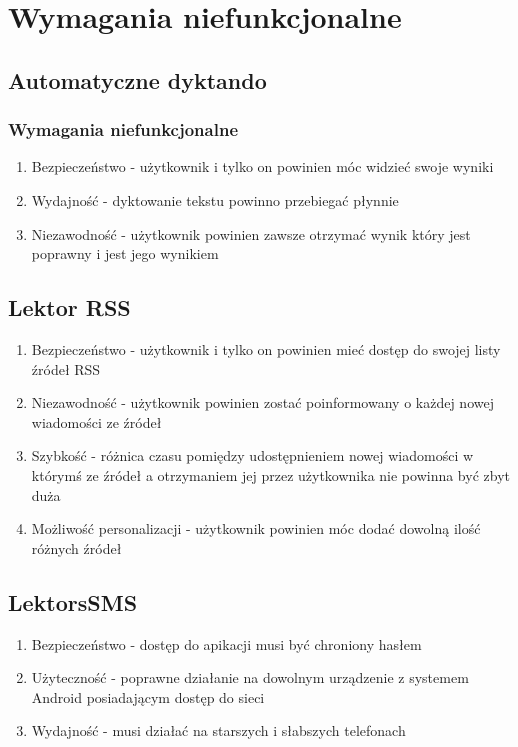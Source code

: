 \section{Wymagania niefunkcjonalne}
\subsection{Automatyczne dyktando}
\subsubsection{Wymagania niefunkcjonalne}
\begin{enumerate}
	\item Bezpieczeństwo - użytkownik i tylko on powinien móc widzieć swoje wyniki
	\item Wydajność - dyktowanie tekstu powinno przebiegać płynnie
	\item Niezawodność - użytkownik powinien zawsze otrzymać wynik który jest poprawny i jest jego wynikiem
\end{enumerate}
\subsection{Lektor RSS}
\begin{enumerate}
	\item Bezpieczeństwo - użytkownik i tylko on powinien mieć dostęp do swojej listy źródeł RSS
	\item Niezawodność - użytkownik powinien zostać poinformowany o każdej nowej wiadomości ze źródeł
	\item Szybkość - różnica czasu pomiędzy udostępnieniem nowej wiadomości w którymś ze źródeł a otrzymaniem jej przez użytkownika nie powinna być zbyt duża
	\item Możliwość personalizacji - użytkownik powinien móc dodać dowolną ilość różnych źródeł
\end{enumerate}
\subsection{LektorsSMS}
\begin{enumerate}
	\item Bezpieczeństwo - dostęp do apikacji musi być chroniony hasłem
	\item Użyteczność - poprawne działanie na dowolnym urządzenie z systemem Android posiadającym dostęp do sieci
	\item Wydajność - musi działać na starszych i słabszych telefonach
\end{enumerate}


